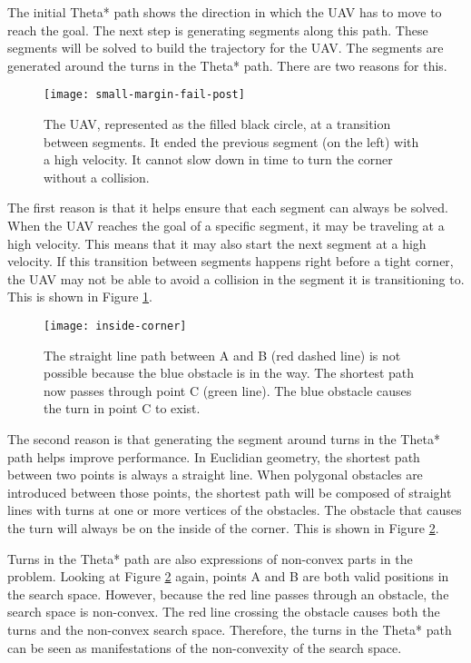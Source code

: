 The initial Theta* path shows the direction in which the UAV has to move to reach the goal. The next step is generating segments along this path. These segments will be solved to build the trajectory for the UAV. The segments are generated around the turns in the Theta* path. There are two reasons for this.
\par
\begin{figure}
\centering
\texttt{[image: small-margin-fail-post]}
\caption[An example of the UAV going too fast to execute a turn]{The  UAV, represented as the filled black circle, at a transition between segments. It ended the previous segment (on the left) with a high velocity. It cannot slow down in time to turn the corner without a collision.}
\label{fig:turn-fail}
\end{figure}
The first reason is that it helps ensure that each segment can always be solved. When the UAV reaches the goal of a specific segment, it may be traveling at a high velocity. This means that it may also start the next segment at a high velocity. If this transition between segments happens right before a tight corner, the UAV may not be able to avoid a collision in the segment it is transitioning to. This is shown in Figure \ref{fig:turn-fail}.
\par
\begin{figure}
\centering
\texttt{[image: inside-corner]}
\caption[A demonstration of how obstacles cause turns]{The straight line path between A and B (red dashed line) is not possible because the blue obstacle is in the way. The shortest path now passes through point C (green line). The blue obstacle causes the turn in point C to exist.}
\label{fig:inside-corner}
\end{figure}
The second reason is that generating the segment around turns in the Theta* path helps improve performance. In Euclidian geometry, the shortest path between two points is always a straight line. When polygonal obstacles are introduced between those points, the shortest path will be composed of straight lines with turns at one or more vertices of the obstacles. The obstacle that causes the turn will always be on the inside of the corner. This is shown in Figure \ref{fig:inside-corner}.
\par
Turns in the Theta* path are also expressions of non-convex parts in the problem. Looking at Figure \ref{fig:inside-corner} again, points A and B are both valid positions in the search space. However, because the red line passes through an obstacle, the search space is non-convex. The red line crossing the obstacle causes both the turns and the non-convex search space. Therefore, the turns in the Theta* path can be seen as manifestations of the non-convexity of the search space.
